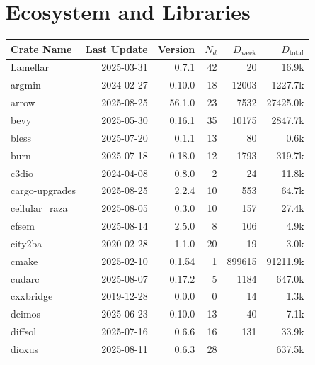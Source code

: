 \documentclass{article}
\begin{document}
\section{Ecosystem and Libraries}

\begin{table}
    \centering
    \begin{tabular}{l r r r r r}
        \toprule
        Crate Name &Last Update &Version &$N_d$ &$D_\text{week}$ &$D_\text{total}$\\
        \midrule
        Lamellar         &2025-03-31 &0.7.1      &42   &20       &     16.9k\\
        argmin           &2024-02-27 &0.10.0     &18   &12003    &   1227.7k\\
        arrow            &2025-08-25 &56.1.0     &23   &7532     &  27425.0k\\
        bevy             &2025-05-30 &0.16.1     &35   &10175    &   2847.7k\\
        bless            &2025-07-20 &0.1.1      &13   &80       &      0.6k\\
        burn             &2025-07-18 &0.18.0     &12   &1793     &    319.7k\\
        c3dio            &2024-04-08 &0.8.0      &2    &24       &     11.8k\\
        cargo-upgrades   &2025-08-25 &2.2.4      &10   &553      &     64.7k\\
        cellular\_raza   &2025-08-05 &0.3.0      &10   &157      &     27.4k\\
        cfsem            &2025-08-14 &2.5.0      &8    &106      &      4.9k\\
        city2ba          &2020-02-28 &1.1.0      &20   &19       &      3.0k\\
        cmake            &2025-02-10 &0.1.54     &1    &899615   &  91211.9k\\
        cudarc           &2025-08-07 &0.17.2     &5    &1184     &    647.0k\\
        cxxbridge        &2019-12-28 &0.0.0      &0    &14       &      1.3k\\
        deimos           &2025-06-23 &0.10.0     &13   &40       &      7.1k\\
        diffsol          &2025-07-16 &0.6.6      &16   &131      &     33.9k\\
        dioxus           &2025-08-11 &0.6.3      &28   &         &    637.5k\\

\end{tabular}
\end{table}
\end{document}

